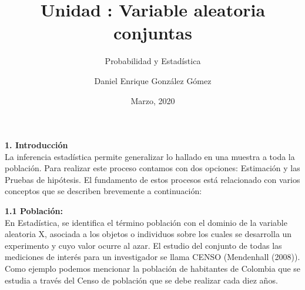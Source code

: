 \documentclass[base=hide,11pt]{elegantbook}
\title{Unidad : Variable aleatoria conjuntas}
\subtitle{Probabilidad y Estadística}
\author{Daniel Enrique González Gómez}
\institute{Pontificia Universidad Javeriana Cali}
\date{Marzo, 2020}
\begin{document}
\textcolor{col4}{\bf \LARGE 1. Introducción}\\
La inferencia estadística permite generalizar lo hallado en una muestra a toda la población. Para realizar este proceso contamos con dos opciones: Estimación y las Pruebas de hipótesis. El fundamento de estos procesos está relacionado con varios conceptos que se describen brevemente a continuación:

\textcolor{col4}{\bf \large 1.1 Población:} \\
En Estadística, se identifica el término población con el dominio de la variable aleatoria X, asociada a los objetos o individuos sobre los cuales se desarrolla un experimento y cuyo valor ocurre al azar. El estudio del conjunto de todas las mediciones de interés para un investigador se llama CENSO (Mendenhall (2008)). Como ejemplo podemos mencionar la población de habitantes de Colombia que se estudia a través del Censo de población que se debe realizar cada diez años. 
	
\end{document}
